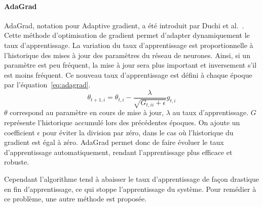 \paragraph{AdaGrad}
AdaGrad, notation pour Adaptive gradient, a été introduit par Duchi et al.~\cite{Duchi2011}. Cette méthode d'optimisation de gradient permet d'adapter dynamiquement le taux d'apprentissage. La variation du taux d'apprentissage est proportionnelle à l'historique des mises à jour des paramètres du réseau de neurones. Ainsi, si un paramètre est peu fréquent, la mise à jour sera plus important et inversement s'il est moins fréquent. Ce nouveau taux d'apprentissage est défini à chaque époque par l'équation~\ref{eq:adagrad}.
\begin{equation}
  \theta_{t+1, i} = \theta_{t, i} - \frac{\lambda}{\sqrt{G_{t, ii} + \epsilon}}g_{t, i}
  \label{eq:adagrad}
\end{equation}
$\theta$ correspond au paramètre en cours de mise à jour, $\lambda$ au taux d'apprentissage. $G$ représente l'historique accumulé lors des précédentes époques. On ajoute un coefficient $\epsilon$ pour éviter la division par zéro, dans le cas où l'historique du gradient est égal à zéro. AdaGrad permet donc de faire évoluer le taux d'apprentissage automatiquement, rendant l'apprentissage plus efficace et robuste.

Cependant l'algorithme tend à abaisser le taux d'apprentissage de façon drastique en fin d'apprentissage, ce qui stoppe l'apprentissage du système. Pour remédier à ce problème, une autre méthode est proposée.

